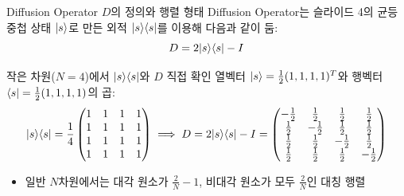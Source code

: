 \documentclass[aspectratio=169, 10pt]{beamer}
\begin{document}
\begin{frame}{Diffusion Operator $D$의 정의와 행렬 형태}
    Diffusion Operator는 슬라이드 4의 균등 중첩 상태 $|s\rangle$로 만든 외적 $|s\rangle\langle s|$를 이용해 다음과 같이 둠:
    $$D = 2|s\rangle\langle s| - I$$
    \pause
    \vspace{0.1cm}
    \begin{qcblock}{작은 차원($N=4$)에서 $|s\rangle\langle s|$와 $D$ 직접 확인}
        열벡터 $|s\rangle = \frac{1}{2}(1,1,1,1)^T$와 행벡터 $\langle s| = \frac{1}{2}(1,1,1,1)$의 곱:
        $$|s\rangle\langle s| = \frac{1}{4}\begin{pmatrix} 1 & 1 & 1 & 1 \\ 1 & 1 & 1 & 1 \\ 1 & 1 & 1 & 1 \\ 1 & 1 & 1 & 1 \end{pmatrix} \implies D = 2|s\rangle\langle s| - I = \begin{pmatrix} -\frac{1}{2} & \frac{1}{2} & \frac{1}{2} & \frac{1}{2} \\ \frac{1}{2} & -\frac{1}{2} & \frac{1}{2} & \frac{1}{2} \\ \frac{1}{2} & \frac{1}{2} & -\frac{1}{2} & \frac{1}{2} \\ \frac{1}{2} & \frac{1}{2} & \frac{1}{2} & -\frac{1}{2} \end{pmatrix}$$
        \begin{itemize}
            \item 일반 $N$차원에서는 대각 원소가 $\frac{2}{N} - 1$, 비대각 원소가 모두 $\frac{2}{N}$인 대칭 행렬
        \end{itemize}
    \end{qcblock}
\end{frame}
\end{document}
